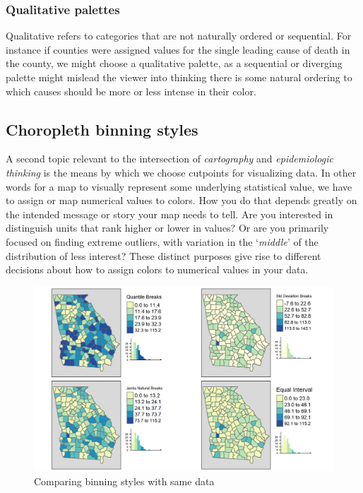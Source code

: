 \documentclass[
]{book}
\begin{document}
\hypertarget{qualitative-palettes}{%
\subsubsection{Qualitative palettes}\label{qualitative-palettes}}

Qualitative refers to categories that are not naturally ordered or sequential. For instance if counties were assigned values for the single leading cause of death in the county, we might choose a qualitative palette, as a sequential or diverging palette might mislead the viewer into thinking there is some natural ordering to which causes should be more or less intense in their color.

\hypertarget{choropleth-binning-styles}{%
\subsection{Choropleth binning styles}\label{choropleth-binning-styles}}

A second topic relevant to the intersection of \emph{cartography} and \emph{epidemiologic thinking} is the means by which we choose cutpoints for visualizing data. In other words for a map to visually represent some underlying statistical value, we have to assign or map numerical values to colors. How you do that depends greatly on the intended message or story your map needs to tell. Are you interested in distinguish units that rank higher or lower in values? Or are you primarily focused on finding extreme outliers, with variation in the `\emph{middle}' of the distribution of less interest? These distinct purposes give rise to different decisions about how to assign colors to numerical values in your data.

\begin{figure}
\includegraphics[width=0.75\linewidth]{images/cutpoints-vlbw} \caption{Comparing binning styles with same data}\label{fig:unnamed-chunk-33}
\end{figure}
\end{document}
